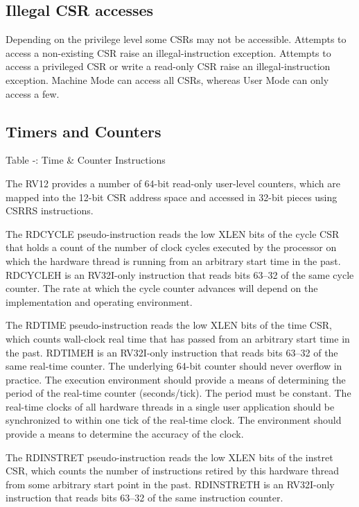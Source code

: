 \subsection{Illegal CSR accesses}\label{illegal-csr-accesses}

Depending on the privilege level some CSRs may not be accessible.
Attempts to access a non-existing CSR raise an illegal-instruction
exception. Attempts to access a privileged CSR or write a read-only CSR
raise an illegal-instruction exception. Machine Mode can access all
CSRs, whereas User Mode can only access a
few.\protect\hypertarget{_Toc326677756}{}{}

\subsection{Timers and Counters}\label{timers-and-counters}

\missingfigure{}

Table ‑: Time \& Counter Instructions

The RV12 provides a number of 64-bit read-only user-level counters,
which are mapped into the 12-bit CSR address space and accessed in
32-bit pieces using CSRRS instructions.

The RDCYCLE pseudo-instruction reads the low XLEN bits of the cycle CSR
that holds a count of the number of clock cycles executed by the
processor on which the hardware thread is running from an arbitrary
start time in the past. RDCYCLEH is an RV32I-only instruction that reads
bits 63--32 of the same cycle counter. The rate at which the cycle
counter advances will depend on the implementation and operating
environment.

The RDTIME pseudo-instruction reads the low XLEN bits of the time CSR,
which counts wall-clock real time that has passed from an arbitrary
start time in the past. RDTIMEH is an RV32I-only instruction that reads
bits 63--32 of the same real-time counter. The underlying 64-bit counter
should never overflow in practice. The execution environment should
provide a means of determining the period of the real-time counter
(seconds/tick). The period must be constant. The real-time clocks of all
hardware threads in a single user application should be synchronized to
within one tick of the real-time clock. The environment should provide a
means to determine the accuracy of the clock.

The RDINSTRET pseudo-instruction reads the low XLEN bits of the instret
CSR, which counts the number of instructions retired by this hardware
thread from some arbitrary start point in the past. RDINSTRETH is an
RV32I-only instruction that reads bits 63--32 of the same instruction
counter.


